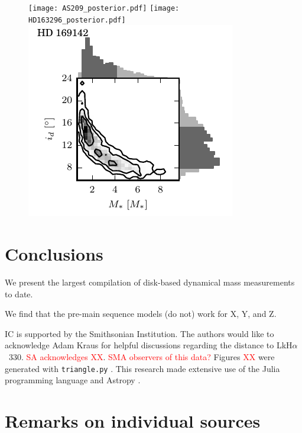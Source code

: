\documentclass[twocolumn]{aastex6}
\newcommand{\todo}[1]{ \textcolor{red}{#1}}
\begin{document}
\begin{figure}[htb]
\begin{center}
\texttt{[image: AS209\_posterior.pdf]}
\texttt{[image: HD163296\_posterior.pdf]}
\includegraphics{HD169142_posterior.pdf}
\end{center}
\end{figure}



\section{Conclusions}

We present the largest compilation of disk-based dynamical mass measurements to date.

We find that the pre-main sequence models (do not) work for X, Y, and Z.

\acknowledgments
IC is supported by the Smithsonian Institution. The authors would like to acknowledge Adam Kraus for helpful discussions regarding the distance to LkH$\alpha$~330. \todo{SA acknowledges XX}. \todo{SMA observers of this data?}  Figures \todo{XX} were generated with \texttt{triangle.py} \citep{foreman-mackey14}. This research made extensive use of the Julia programming language \citep{julia12} and Astropy \citep{astropy13}.




\appendix

\section{Remarks on individual sources}
\end{document}
